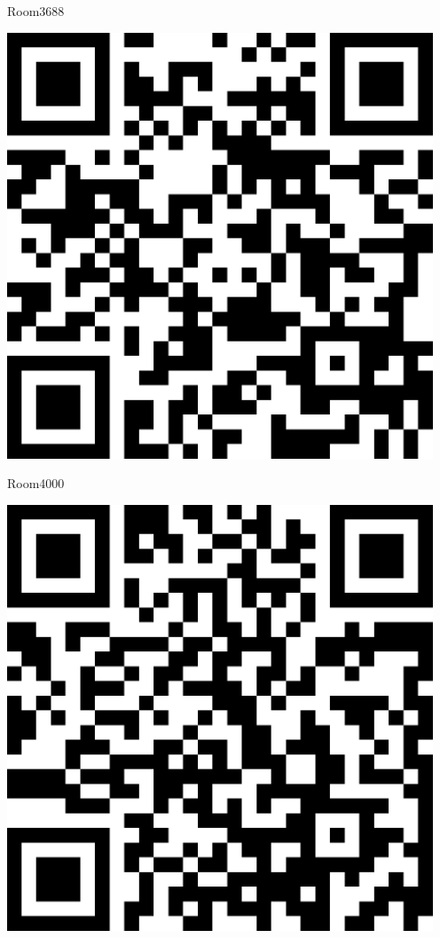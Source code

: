 \documentclass[letterpaper]{article}
\begin{document}
 \hfill{\small Room3688} 

 \vspace{1in} 
 \pagebreak 
{} 
 \vspace*{\fill} 
 \begingroup 
 \centerline{\includegraphics[scale=1,width=5in,height=5in]{Room4000.png}} 
 \endgroup 
 \vspace*{\fill} 

 \hfill{\small Room4000} 

 \vspace{1in} 
 \pagebreak 
{} 
 \vspace*{\fill} 
 \begingroup 
 \centerline{\includegraphics[scale=1,width=5in,height=5in]{Room595.png}} 
 \endgroup 
 \vspace*{\fill} 
\end{document}
